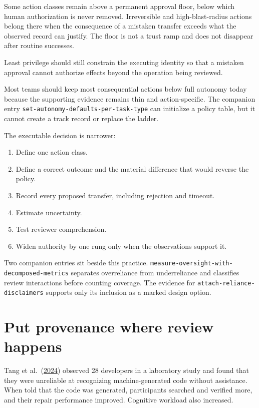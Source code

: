 Some action classes remain above a permanent approval floor, below which human authorization is never removed. Irreversible and high-blast-radius actions belong there when the consequence of a mistaken transfer exceeds what the observed record can justify. The floor is not a trust ramp and does not disappear after routine successes.

Least privilege should still constrain the executing identity so that a mistaken approval cannot authorize effects beyond the operation being reviewed.

Most teams should keep most consequential actions below full autonomy today because the supporting evidence remains thin and action-specific. The companion entry \texttt{set-autonomy-defaults-per-task-type} can initialize a policy table, but it cannot create a track record or replace the ladder.


The executable decision is narrower:

\begin{enumerate}
\def\labelenumi{\arabic{enumi}.}
\tightlist
\item
  Define one action class.
\item
  Define a correct outcome and the material difference that would reverse the policy.
\item
  Record every proposed transfer, including rejection and timeout.
\item
  Estimate uncertainty.
\item
  Test reviewer comprehension.
\item
  Widen authority by one rung only when the observations support it.
\end{enumerate}

Two companion entries sit beside this practice. \texttt{measure-oversight-with-decomposed-metrics} separates overreliance from underreliance and classifies review interactions before counting coverage. The evidence for \texttt{attach-reliance-disclaimers} supports only its inclusion as a marked design option.

\hypertarget{put-provenance-where-review-happens}{%
\section{Put provenance where review happens}\label{put-provenance-where-review-happens}}

Tang et al.~(\href{https://arxiv.org/abs/2405.16081}{2024}) observed 28 developers in a laboratory study and found that they were unreliable at recognizing machine-generated code without assistance. When told that the code was generated, participants searched and verified more, and their repair performance improved. Cognitive workload also increased.

